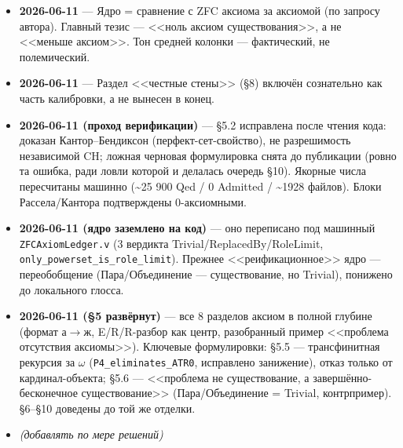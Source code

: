 \documentclass[11pt,a4paper]{article}
\begin{document}
\begin{itemize}
\item \textbf{2026-06-11} --- Ядро = сравнение с ZFC аксиома за аксиомой (по запросу автора). Главный тезис --- <<ноль аксиом существования>>, а не <<меньше аксиом>>. Тон средней колонки --- фактический, не полемический.
\item \textbf{2026-06-11} --- Раздел <<честные стены>> (\S{}8) включён сознательно как часть калибровки, а не вынесен в конец.
\item \textbf{2026-06-11 (проход верификации)} --- \S{}5.2 исправлена после чтения кода: доказан Кантор--Бендиксон (перфект-сет-свойство), не разрешимость независимой CH; ложная черновая формулировка снята до публикации (ровно та ошибка, ради ловли которой и делалась очередь \S{}10). Якорные числа пересчитаны машинно (\textasciitilde{}25 900 Qed / 0 Admitted / \textasciitilde{}1928 файлов). Блоки Рассела/Кантора подтверждены 0-аксиомными.
\item \textbf{2026-06-11 (ядро заземлено на код)} --- оно переписано под машинный \texttt{ZFCAxiom\allowbreak{}Ledger.v} (3 вердикта Trivial/ReplacedBy/RoleLimit, \texttt{only\_\allowbreak{}powerset\_\allowbreak{}is\_\allowbreak{}role\_\allowbreak{}limit}). Прежнее <<реификационное>> ядро --- переобобщение (Пара/Объединение --- существование, но Trivial), понижено до локального глосса.
\item \textbf{2026-06-11 (\S{}5 развёрнут)} --- все 8 разделов аксиом в полной глубине (формат а$\to$ж, E/R/R-разбор как центр, разобранный пример <<проблема отсутствия аксиомы>>). Ключевые формулировки: \S{}5.5 --- трансфинитная рекурсия за $\omega$ (\texttt{P4\_\allowbreak{}eliminates\_\allowbreak{}ATR0}, исправлено занижение), отказ только от кардинал-объекта; \S{}5.6 --- <<проблема не существование, а завершённо-бесконечное существование>> (Пара/Объединение = Trivial, контрпример). \S{}6--\S{}10 доведены до той же отделки.
\item \emph{(добавлять по мере решений)}
\end{itemize}
\end{document}
